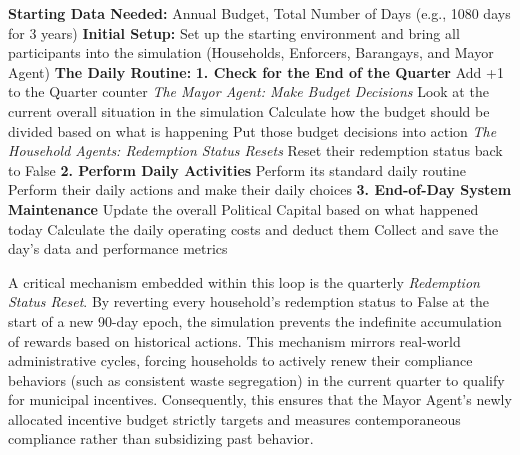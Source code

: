 \begin{algorithm}[H]
\caption{Main Simulation Loop}
\label{alg:main_loop_english}
\begin{algorithmic}[1]
\State \textbf{Starting Data Needed:} Annual Budget, Total Number of Days (e.g., 1080 days for 3 years)
\State \textbf{Initial Setup:} Set up the starting environment and bring all participants into the simulation (Households, Enforcers, Barangays, and Mayor Agent)
\Statex
\State \textbf{The Daily Routine:}
    \Statex
    \State \textbf{1. Check for the End of the Quarter}
        \State Add +1 to the Quarter counter
        \Statex
        \State \textit{The Mayor Agent: Make Budget Decisions}
        \State Look at the current overall situation in the simulation
        \State Calculate how the budget should be divided based on what is happening
        \State Put those budget decisions into action
        \Statex
        \State \textit{The Household Agents: Redemption Status Resets}
            \State Reset their redemption status back to False
        \EndFor
    \EndIf
    \Statex
    \State \textbf{2. Perform Daily Activities}
        \State Perform its standard daily routine
    \EndFor
        \State Perform their daily actions and make their daily choices
    \EndFor
    \Statex
    \State \textbf{3. End-of-Day System Maintenance}
    \State Update the overall Political Capital based on what happened today
    \State Calculate the daily operating costs and deduct them
    \State Collect and save the day's data and performance metrics
\EndFor
\end{algorithmic}
\end{algorithm}

A critical mechanism embedded within this loop is the quarterly \textit{Redemption Status Reset}. By reverting every household's redemption status to False at the start of a new 90-day epoch, the simulation prevents the indefinite accumulation of rewards based on historical actions. This mechanism mirrors real-world administrative cycles, forcing households to actively renew their compliance behaviors (such as consistent waste segregation) in the current quarter to qualify for municipal incentives. Consequently, this ensures that the Mayor Agent's newly allocated incentive budget strictly targets and measures contemporaneous compliance rather than subsidizing past behavior.


